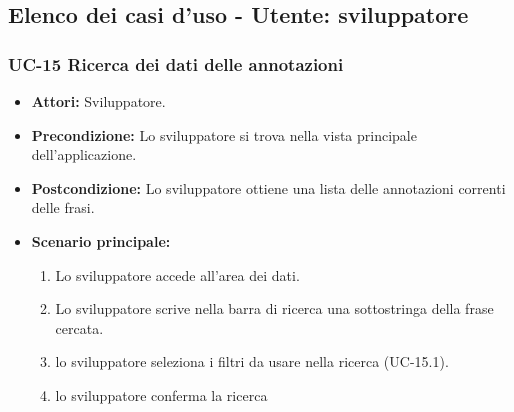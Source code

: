\subsection{Elenco dei casi d'uso - Utente: sviluppatore}	

\subsubsection{UC-15 Ricerca dei dati delle annotazioni}
		\begin{itemize}
			\item \textbf{Attori:} Sviluppatore.
			\item \textbf{Precondizione:} Lo sviluppatore si trova nella vista principale dell'applicazione.
			\item \textbf{Postcondizione:} Lo sviluppatore ottiene una lista delle annotazioni correnti delle frasi.
			\item \textbf{Scenario principale:}
				\begin{enumerate}
					\item Lo sviluppatore accede all'area dei dati.
					\item Lo sviluppatore scrive nella barra di ricerca una sottostringa della frase cercata.
					\item lo sviluppatore seleziona i filtri da usare nella ricerca (UC-15.1).
					\item lo sviluppatore conferma la ricerca
				\end{enumerate}
		\end{itemize}
	
